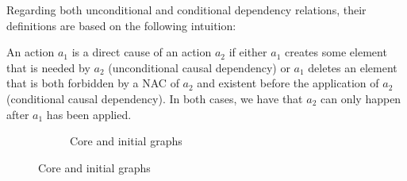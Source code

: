 Regarding both unconditional and conditional dependency relations, their definitions are based on the following intuition:

\begin{intuition} An action $a_1$ is a direct cause of an action $a_2$ if either $a_1$ creates some element that is needed by $a_2$ (unconditional causal dependency) or $a_1$ deletes an element that is both forbidden by a NAC of $a_2$ and existent before the application of $a_2$ (conditional causal dependency). In both cases, we have that $a_2$ can only happen after $a_1$ has been applied.
\end{intuition}

\begin{figure}[!ht]
  \centering
  \begin{subfigure}[t]{.5\textwidth}
    \centerline{}
    \caption{Core and initial graphs}\label{fig:process:unconditional-relation:core-graph}
  \end{subfigure}


\end{figure}
